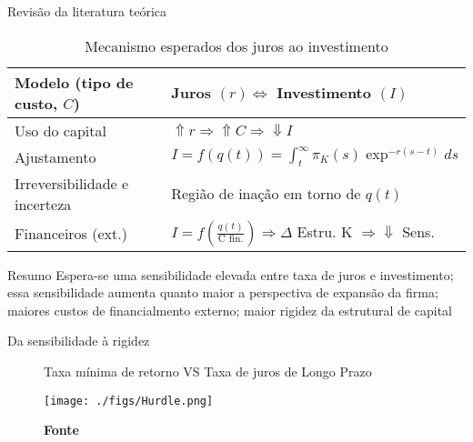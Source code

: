 \documentclass[presentation]{beamer}
\begin{document}
\begin{frame}[label={sec:org35cf161}]{Revisão da literatura teórica}
\begin{table}[htbp]
\caption{Mecanismo esperados dos juros ao investimento}
\centering
\begin{tabular}{ll}
\hline
Modelo (tipo de custo, \(C\)) & Juros \((r) \Leftrightarrow\) Investimento \((I)\)\\
\hline
Uso do capital & \(\Uparrow r \Rightarrow \Uparrow C \Rightarrow \Downarrow I\)\\
Ajustamento & \(I = f(q(t)) = \int_{t}^{{\infty}} \pi_{K}(s)\exp^{-r(s-t)}ds\)\\
Irreversibilidade e incerteza & Região de inação em torno de \(q(t)\)\\
Financeiros (ext.) & \(I = f\left(\frac{q(t)}{\text{C fin.}}\right) \Rightarrow \Delta\) Estru. K \(\Rightarrow \Downarrow\) Sens.\\
\hline
\end{tabular}
\end{table}

\begin{block}{Resumo}
Espera-se uma sensibilidade elevada entre taxa de juros e investimento; essa sensibilidade aumenta quanto maior a perspectiva de expansão da firma; maiores custos de financialmento externo; maior rigidez da estrutural de capital
\end{block}
\end{frame}
\begin{frame}[label={sec:org796c0bf}]{Da sensibilidade à rigidez}
\begin{figure}[htb]
\centering
\caption{Taxa mínima de retorno VS Taxa de juros de Longo Prazo} 
\texttt{[image: ./figs/Hurdle.png]}
\label{fig:cycles}
\caption*{\textbf{Fonte} \textcite[p.~6]{sharpe_2020_Why}}
\end{figure}
\end{frame}
\end{document}
